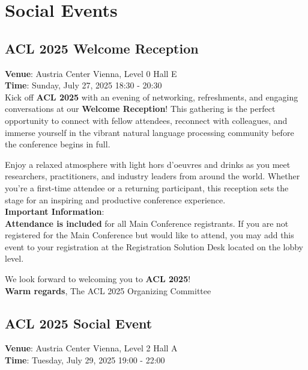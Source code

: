 \chapter{Social Events}

\section{ACL 2025 Welcome Reception}
\vspace*{0.2cm}

\textbf{Venue}: Austria Center Vienna, Level 0 Hall E\\
\textbf{Time}: Sunday, July 27, 2025 18:30 - 20:30\\

Kick off \textbf{ACL 2025} with an evening of networking, refreshments, and engaging conversations at our \textbf{Welcome Reception}! This gathering is the perfect opportunity to connect with fellow attendees, reconnect with colleagues, and immerse yourself in the vibrant natural language processing community before the conference begins in full.

Enjoy a relaxed atmosphere with light hors d’oeuvres and drinks as you meet researchers, practitioners, and industry leaders from around the world. Whether you're a first-time attendee or a returning participant, this reception sets the stage for an inspiring and productive conference experience.\\

\textbf{Important Information}:\\
\textbf{Attendance is included} for all Main Conference registrants.
If you are not registered for the Main Conference but would like to attend, you may add this event to your registration at the Registration Solution Desk located on the lobby level.

We look forward to welcoming you to \textbf{ACL 2025}!\\

\textbf{Warm regards},
The ACL 2025 Organizing Committee

\section{ACL 2025 Social Event}
\vspace*{0.2cm}

\textbf{Venue}: Austria Center Vienna, Level 2 Hall A\\
\textbf{Time}: Tuesday, July 29, 2025 19:00 - 22:00\\

